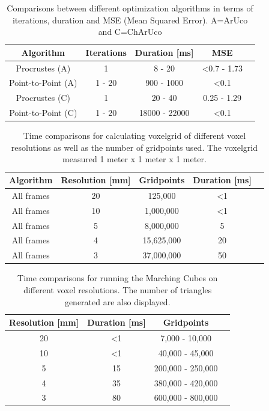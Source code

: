 \documentclass[10pt,twocolumn,letterpaper]{article}
\begin{document}
\begin{table}[h!]
  \begin{center}
    \begin{tabular}{c|c|c|c p{4cm}}
      \textbf{Algorithm} & \textbf{Iterations} & \textbf{Duration [ms]} & \textbf{MSE}\\
      \hline
      Procrustes (A)  & 1 & 8 - 20 & \textless 0.7 - 1.73\\
      Point-to-Point (A) & 1 - 20 & 900 - 1000 & \textless 0.1\\
      Procrustes (C) & 1 & 20 - 40 & 0.25 - 1.29\\
      Point-to-Point (C) & 1 - 20 & 18000 - 22000 & \textless 0.1\\
    \end{tabular}
     \caption{Comparisons between different optimization algorithms in terms of iterations, duration and MSE (Mean Squared Error). A=ArUco and C=ChArUco}
     \label{tab:table1}
  \end{center}
\end{table}

\begin{table}[h!]
  \begin{center}
    \begin{tabular}{c|c|c|c p{4cm}}
      \textbf{Algorithm} & \textbf{Resolution [mm]} & \textbf{Gridpoints} & \textbf{Duration [ms]}\\
      \hline
      All frames & 20 & 125,000 & \textless 1\\
      All frames & 10 & 1,000,000 & \textless 1\\
      All frames & 5 & 8,000,000 & 5\\
      All frames & 4 & 15,625,000 & 20\\
      All frames & 3 & 37,000,000 & 50\\
    \end{tabular}
     \caption{Time comparisons for calculating voxelgrid of different voxel resolutions as well as the number of gridpoints used. The voxelgrid measured 1 meter x 1 meter x 1 meter.}
     \label{tab:table2}
  \end{center}
\end{table}

\begin{table}[h!]
  \begin{center}
    \begin{tabular}{c|c|c p{4cm}}
      \textbf{Resolution [mm]} & \textbf{Duration [ms]} & \textbf{Gridpoints}\\
      \hline
      20 & \textless 1 & 7,000 - 10,000\\
      10 & \textless 1 & 40,000 - 45,000\\
      5 & 15 & 200,000 - 250,000\\
      4 & 35 & 380,000 - 420,000\\
      3 & 80 & 600,000 - 800,000\\
    \end{tabular}
     \caption{Time comparisons for running the Marching Cubes on different voxel resolutions. The number of triangles generated are also displayed.}
     \label{tab:table3}
  \end{center}
\end{table}
\end{document}
